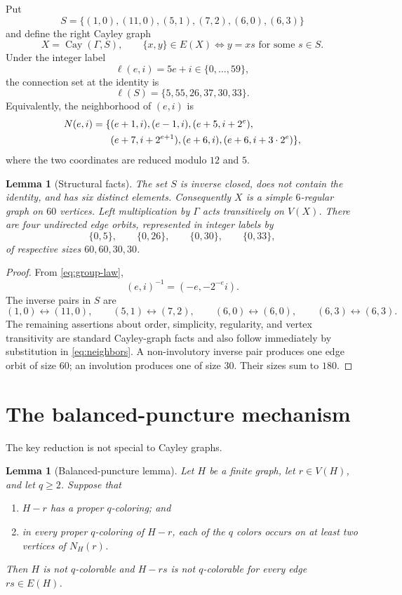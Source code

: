\documentclass[10pt]{amsart}
\newcommand{\cay}{\operatorname{Cay}}
\newtheorem{lemma}[theorem]{Lemma}
\theoremstyle{definition}
\begin{document}
Put
\begin{equation}\label{eq:S}
 S=\{(1,0),(11,0),(5,1),(7,2),(6,0),(6,3)\}
\end{equation}
and define the right Cayley graph
\[
  X=\cay(\Gamma,S),\qquad
  \{x,y\}\in E(X)\Longleftrightarrow y=xs
  \text{ for some }s\in S.
\]
Under the integer label
\begin{equation}\label{eq:label}
  \ell(e,i)=5e+i\in\{0,\ldots,59\},
\end{equation}
the connection set at the identity is
\[
  \ell(S)=\{5,55,26,37,30,33\}.
\]
Equivalently, the neighborhood of $(e,i)$ is
\begin{align}\label{eq:neighbors}
N(e,i)=\{&(e+1,i),(e-1,i),(e+5,i+2^e),\notag\\
         &(e+7,i+2^{e+1}),(e+6,i),(e+6,i+3\cdot2^e)\},
\end{align}
where the two coordinates are reduced modulo $12$ and $5$.

\begin{lemma}[Structural facts]\label{lem:structure}
The set $S$ is inverse closed, does not contain the identity, and has six
distinct elements.  Consequently $X$ is a simple $6$-regular graph on
$60$ vertices.  Left multiplication by $\Gamma$ acts transitively on
$V(X)$.  There are four undirected edge orbits, represented in integer labels
by
\[
 \{0,5\},\qquad \{0,26\},\qquad \{0,30\},\qquad \{0,33\},
\]
of respective sizes $60,60,30,30$.
\end{lemma}

\begin{proof}
From \eqref{eq:group-law},
\[
 (e,i)^{-1}=(-e,-2^{-e}i).
\]
The inverse pairs in $S$ are
\[
 (1,0)\leftrightarrow(11,0),\qquad
 (5,1)\leftrightarrow(7,2),\qquad
 (6,0)\leftrightarrow(6,0),\qquad
 (6,3)\leftrightarrow(6,3).
\]
The remaining assertions about order, simplicity, regularity, and vertex
transitivity are standard Cayley-graph facts and also follow immediately by
substitution in \eqref{eq:neighbors}.  A non-involutory inverse pair produces
one edge orbit of size $60$; an involution produces one of size $30$.  Their
sizes sum to $180$.
\end{proof}

\section{The balanced-puncture mechanism}

The key reduction is not special to Cayley graphs.

\begin{lemma}[Balanced-puncture lemma]\label{lem:balanced}
Let $H$ be a finite graph, let $r\in V(H)$, and let $q\geq2$.  Suppose that
\begin{enumerate}[label=(\roman*)]
\item $H-r$ has a proper $q$-coloring; and
\item in every proper $q$-coloring of $H-r$, each of the $q$ colors occurs on
      at least two vertices of $N_H(r)$.
\end{enumerate}
Then $H$ is not $q$-colorable and $H-rs$ is not $q$-colorable for every edge
$rs\in E(H)$.
\end{lemma}
\end{document}
